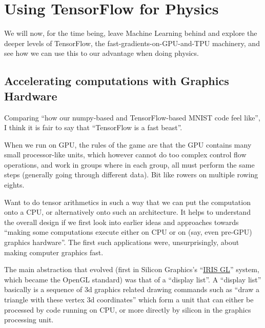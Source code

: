 \documentclass[11pt]{article}
\begin{document}
    
    
    

    
    
    
    

    
    \hypertarget{using-tensorflow-for-physics}{%
\section{Using TensorFlow for
Physics}\label{using-tensorflow-for-physics}}

We will now, for the time being, leave Machine Learning behind and
explore the deeper levels of TensorFlow, the
fast-gradients-on-GPU-and-TPU machinery, and see how we can use this to
our advantage when doing physics.

    \hypertarget{accelerating-computations-with-graphics-hardware}{%
\subsection{Accelerating computations with Graphics
Hardware}\label{accelerating-computations-with-graphics-hardware}}

Comparing ``how our numpy-based and TensorFlow-based MNIST code feel
like'', I think it is fair to say that ``TensorFlow is a fast beast''.

When we run on GPU, the rules of the game are that the GPU contains many
small processor-like units, which however cannot do too complex control
flow operations, and work in groups where in each group, all must
perform the same steps (generally going through different data). Bit
like rowers on multiple rowing eights.

Want to do tensor arithmetics in such a way that we can put the
computation onto a CPU, or alternatively onto such an architecture. It
helps to understand the overall design if we first look into earlier
ideas and approaches towards ``making some computations execute either
on CPU or on (say, even pre-GPU) graphics hardware''. The first such
applications were, unsurprisingly, about making computer graphics fast.

The main abstraction that evolved (first in Silicon Graphics's
``\href{https://en.wikipedia.org/wiki/IRIS_GL}{IRIS GL}'' system, which
became the OpenGL standard) was that of a ``display list''. A ``display
list'' basically is a sequence of 3d graphics related drawing commands
such as ``draw a triangle with these vertex 3d coordinates'' which form
a unit that can either be processed by code running on CPU, or more
directly by silicon in the graphics processing unit.
\end{document}
